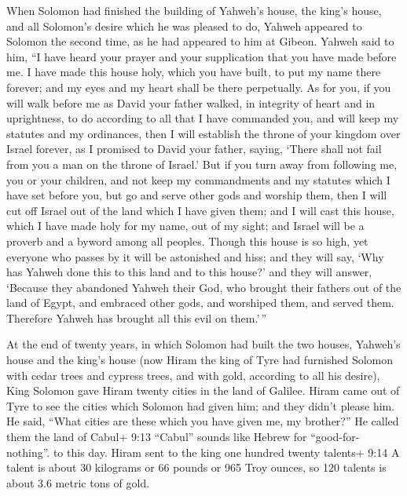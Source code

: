  When Solomon had finished the building of Yahweh's house,
the king's house, and all Solomon's desire which he was pleased to do,
 Yahweh appeared to Solomon the second time, as he had
appeared to him at Gibeon.  Yahweh said to him, ``I have
heard your prayer and your supplication that you have made before me. I
have made this house holy, which you have built, to put my name there
forever; and my eyes and my heart shall be there perpetually.
 As for you, if you will walk before me as David your father
walked, in integrity of heart and in uprightness, to do according to all
that I have commanded you, and will keep my statutes and my ordinances,
 then I will establish the throne of your kingdom over
Israel forever, as I promised to David your father, saying, `There shall
not fail from you a man on the throne of Israel.'  But if
you turn away from following me, you or your children, and not keep my
commandments and my statutes which I have set before you, but go and
serve other gods and worship them,  then I will cut off
Israel out of the land which I have given them; and I will cast this
house, which I have made holy for my name, out of my sight; and Israel
will be a proverb and a byword among all peoples.  Though
this house is so high, yet everyone who passes by it will be astonished
and hiss; and they will say, `Why has Yahweh done this to this land and
to this house?'  and they will answer, `Because they
abandoned Yahweh their God, who brought their fathers out of the land of
Egypt, and embraced other gods, and worshiped them, and served them.
Therefore Yahweh has brought all this evil on them.'\,''

 At the end of twenty years, in which Solomon had built the
two houses, Yahweh's house and the king's house  (now Hiram
the king of Tyre had furnished Solomon with cedar trees and cypress
trees, and with gold, according to all his desire), King Solomon gave
Hiram twenty cities in the land of Galilee.  Hiram came out
of Tyre to see the cities which Solomon had given him; and they didn't
please him.  He said, ``What cities are these which you
have given me, my brother?'' He called them the land of Cabul+ 9:13
``Cabul'' sounds like Hebrew for ``good-for-nothing''. to this day.
 Hiram sent to the king one hundred twenty talents+ 9:14 A
talent is about 30 kilograms or 66 pounds or 965 Troy ounces, so 120
talents is about 3.6 metric tons of gold.

